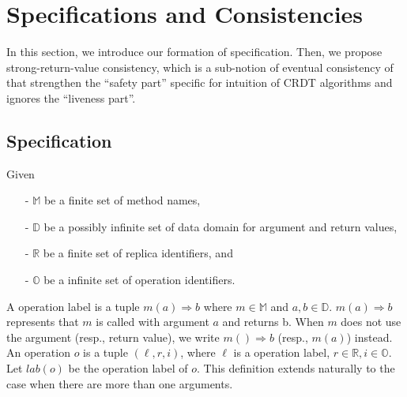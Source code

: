 
\section{Specifications and Consistencies}
\label{sec:specifications and consistencies}

In this section, we introduce our formation of specification. Then, we propose strong-return-value consistency, which is a sub-notion of eventual consistency of \cite{Bouajjani:2014} that strengthen the ``safety part'' specific for intuition of CRDT algorithms and ignores the ``liveness part''.


\subsection{Specification}
\label{subsec:specification}

Given

\begin{itemize}
\setlength{\itemsep}{0.5pt}
\item[-] $\mathbb{M}$ be a finite set of method names,

\item[-] $\mathbb{D}$ be a possibly infinite set of data domain for argument and return values,

\item[-] $\mathbb{R}$ be a finite set of replica identifiers, and

\item[-] $\mathbb{O}$ be a infinite set of operation identifiers.
\end{itemize}


A operation label is a tuple $m(a)\Rightarrow b$ where $m \in \mathbb{M}$ and $a,b \in \mathbb{D}$. {\color {red}$m(a) \Rightarrow b$ represents that $m$ is called with argument $a$ and returns b. When $m$ does not use the argument (resp., return value), we write $m()\Rightarrow b$ (resp., $m(a)$) instead.} An operation $o$ is a tuple $(\ell,r,i)$, where $\ell$ is a operation label, $r \in \mathbb{R},i \in \mathbb{O}$. Let $lab(o)$ be the operation label of $o$. This definition extends naturally to the case when there are more than one arguments.


